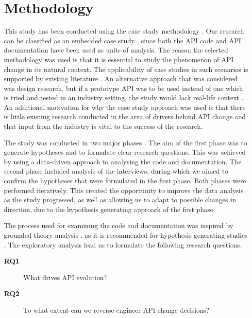 \documentclass{sig-alternate}
\begin{document}
\section{Methodology} \label{methodology}
This study has been conducted using the case study methodology \cite{runeson2009guidelines}. Our research can be classified as an embedded case study \cite{yin2013case}, since both the API code and API documentation have been used as units of analysis. The reason the selected methodology was used is that it is essential to study the phenomenon of API change in its natural context. The applicability of case studies in such scenarios is supported by existing literature \cite{benbasat1987case, robson2002real, runeson2009guidelines, yin2013case}. An alternative approach that was considered was design research, but if a prototype API was to be used instead of one which is tried and tested in an industry setting, the study would lack real-life context \cite{runeson2009guidelines}. An additional motivation for why the case study approach was used is that there is little existing research conducted in the area of drivers behind API change and that input from the industry is vital to the success of the research. 

The study was conducted in two major phases \cite{andersson2007spiral}. The aim of the first phase was to generate hypotheses and to formulate clear research questions. This was achieved by using a data-driven approach to analysing the code and documentation. The second phase included analysis of the interviews, during which we aimed to confirm the hypotheses that were formulated in the first phase. Both phases were performed iteratively. This created the opportunity to improve the data analysis as the study progressed, as well as allowing us to adapt to possible changes in direction, due to the hypothesis generating approach of the first phase. 

The process used for examining the code and documentation was inspired by grounded theory analysis \cite{seaman1999qualitative}, as it is recommended for hypothesis generating studies \cite{runeson2009guidelines, seaman1999qualitative}. The exploratory analysis lead us to formulate the following research questions. 


\begin{description}
\item[\textbf{RQ1}] What drives API evolution?
\item[\textbf{RQ2}] To what extent can we reverse engineer API change decisions?
\end{description}
\end{document}
